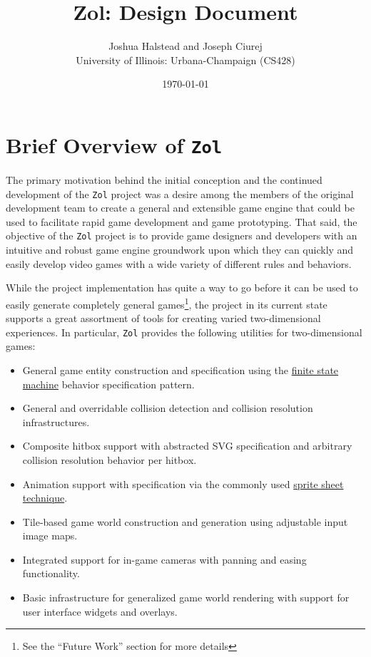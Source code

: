 \documentclass{article}
\newcommand{\projectname}[0] {\texttt{Zol} }
\newcommand{\hreffsm}[1] {\href{http://en.wikipedia.org/wiki/Finite-state\_ machine}{#1}}
\begin{document}
	\title{Zol: Design Document}
	\author{Joshua Halstead and Joseph Ciurej \\
		University of Illinois: Urbana-Champaign (CS428)}
	\date{\today}
	\maketitle

	\tableofcontents
	\clearpage

	\section[Overview]{Brief Overview of \projectname}
	The primary motivation behind the initial conception and the continued
	development of the \projectname project was a desire among the members
	of the original development team to create a general and extensible game 
	engine that could be used to facilitate rapid game development and game
	prototyping.  That said, the objective of the \projectname project is 
	to provide game designers and developers with an intuitive and robust game 
	engine groundwork upon which they can quickly and easily develop video
	games with a wide variety of different rules and behaviors.

	While the project implementation has quite a way to go before it can be
	used to easily generate completely general games\footnote{See the 
	``Future Work'' section for more details}, the project in its current state 
	supports a great assortment of tools for creating varied two-dimensional 
	experiences.  In particular, \projectname provides the following utilities 
	for two-dimensional games:

	\begin{itemize}
		\item General game entity construction and specification using the 
		\hreffsm{finite state machine} behavior specification pattern.

		\item General and overridable collision detection and collision
		resolution infrastructures.

		\item Composite hitbox support with abstracted SVG specification and 
		arbitrary collision resolution behavior per hitbox.

		\item Animation support with specification via the commonly used
		\href{http://en.wikipedia.org/wiki/Sprite\_ (computer\_ graphics)#Sprites\_ by\_ CSS}
		{sprite sheet technique}.

		\item Tile-based game world construction and generation using adjustable 
		input image maps.

		\item Integrated support for in-game cameras with panning and easing
		functionality.

		\item Basic infrastructure for generalized game world rendering with 
		support for user interface widgets and overlays.
	\end{itemize}
\end{document}
